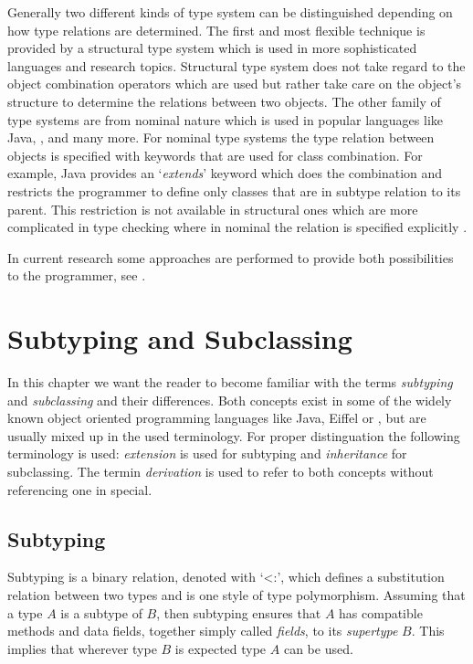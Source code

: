 Generally two different kinds of type system can be distinguished
depending on how type relations are determined. The first and most
flexible technique is provided by a structural type system which is used
in more sophisticated languages and research topics. Structural type
system does not take regard to the object combination operators which
are used but rather take care on the object's structure to determine the
relations between two objects. The other family of type systems are from
nominal nature which is used in popular languages like Java, \cs, \cpp
and many more. For nominal type systems the type relation between objects
is specified with keywords that are used for class combination. For
example, Java provides an `\emph{extends}' keyword which does the combination
and restricts the programmer to define only classes that are in subtype
relation to its parent. This restriction is not available in structural
ones which are more complicated in type checking where in nominal the
relation is specified explicitly \cite{malayeri_integrating_2008,pierce_types_2002}.

In current research some approaches are performed
to provide both possibilities to the programmer, see
\cite{findler_semantic_2004,gil_whiteoak:_2008,malayeri_integrating_2008}.

\section{Subtyping and Subclassing}
\label{chap:subtypingVsSubclassing}
In this chapter we want the reader to become familiar with the terms
\emph{subtyping} and \emph{subclassing} and their differences. Both
concepts exist in some of the widely known object oriented programming
languages like Java, Eiffel or \cpp, but are usually mixed up in the
used terminology. For proper distinguation the following terminology is
used: \emph{extension} is used for subtyping and \emph{inheritance} for
subclassing. The termin \emph{derivation} is used to refer to both concepts without referencing one in
special.

\subsection{Subtyping}
 Subtyping is a binary relation, denoted with
`<:', which defines a substitution relation between two types and is one
style of type polymorphism. Assuming that a type $A$ is a subtype of $B$,
then subtyping ensures that $A$ has compatible methods and data fields,
together simply called \emph{fields}, to its \emph{supertype} $B$. This
implies that wherever type $B$ is expected type $A$ can be used.

